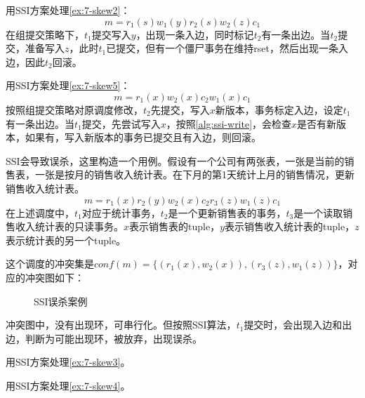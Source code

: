 \begin{example}
    用SSI方案处理\examplename\ref{ex:7-skew2}：
$$
m = r_1(s)w_1(y)r_2(s)w_2(z)c_1
$$
在组提交策略下，$t_1$提交写入$y$，出现一条入边，同时标记$t_2$有一条出边。当$t_2$提交，准备写入$z$，此时$t_1$已提交，但有一个僵尸事务在维持rset，然后出现一条入边，因此$t_2$回滚。
\end{example}
\begin{example}
    用SSI方案处理\examplename\ref{ex:7-skew5}：
$$
m=r_1(x)w_2(x)c_2w_1(x)c_1
$$
按照组提交策略对原调度修改，$t_2$先提交，写入$x$新版本，事务标定入边，设定$t_1$有一条出边。当$t_1$提交，先尝试写入$x$，按照\algorithmname\ref{alg:ssi-write}，会检查$x$是否有新版本，如果有，写入新版本的事务已提交且有入边，则回滚。
\end{example}

\begin{example}\label{ex:ssi}
    SSI会导致误杀，这里构造一个用例。假设有一个公司有两张表，一张是当前的销售表，一张是按月的销售收入统计表。在下月的第1天统计上月的销售情况，更新销售收入统计表。
$$
m = r_1(x)r_2(y)w_2(x)c_2r_3(z)w_1(z)c_1
$$
在上述调度中，$t_1$对应于统计事务，$t_2$是一个更新销售表的事务，$t_3$是一个读取销售收入统计表的只读事务。$x$表示销售表的tuple，$y$表示销售收入统计表的tuple，$z$表示统计表的另一个tuple。

这个调度的冲突集是$conf(m)=\{(r_1(x),w_2(x)), (r_3(z),w_1(z)) \}$，对应的冲突图如下：

\begin{figure}[H]
    \centering
    \caption{SSI误杀案例}
    \label{fig:ssi-false-positive}
\end{figure}

冲突图中，没有出现环，可串行化。但按照SSI算法，$t_1$提交时，会出现入边和出边，判断为可能出现环，被放弃，出现误杀。

\end{example}

\begin{exercise}
    用SSI方案处理\examplename\ref{ex:7-skew3}。
\end{exercise}
\begin{exercise}
    用SSI方案处理\examplename\ref{ex:7-skew4}。
\end{exercise}

